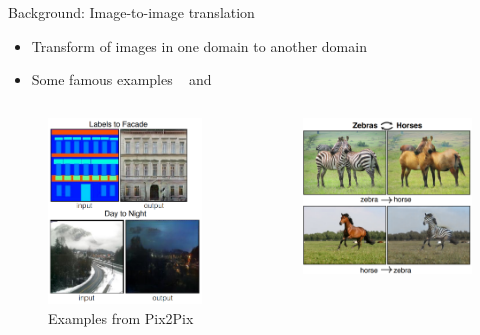 \documentclass{cubeamer}
\begin{document}
\begin{frame}{Background: Image-to-image translation}
    \begin{itemize}
        \item Transform  of images in one domain to another domain
        \item Some famous examples \textemdash ~  \cite{pix2pix} and  \cite{cyclegan}
    \end{itemize}
    \begin{columns}
        \begin{column}{0.4\textwidth}
            \begin{figure}
                \centering
                \includegraphics[width=0.7\columnwidth]{figures/pix2pix-example.PNG}
                \caption{Examples from Pix2Pix \cite{pix2pix}}
            \end{figure}
        \end{column}
        \begin{column}{0.5\textwidth}
            \begin{figure}
                \centering
                \includegraphics[width=0.7\columnwidth]{figures/cyclegan-example.PNG}

\end{figure}
\end{column}
\end{columns}
\end{frame}
\end{document}
